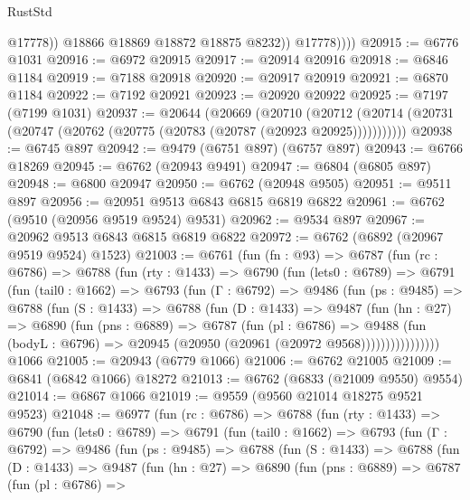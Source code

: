 \begin{lexlean}{RustStd}
\begin{coremodule}
                    @17778))
                @18866
                @18869
                @18872
                @18875
                @8232))
            @17778))))
@20915 := @6776 @1031
@20916 := @6972 @20915
@20917 := @20914 @20916
@20918 := @6846 @1184
@20919 := @7188 @20918
@20920 := @20917 @20919
@20921 := @6870 @1184
@20922 := @7192 @20921
@20923 := @20920 @20922
@20925 := @7197 (@7199 @1031)
@20937 := @20644
    (@20669
      (@20710
        (@20712 (@20714 (@20731 (@20747 (@20762 (@20775 (@20783 (@20787 (@20923 @20925)))))))))))
@20938 := @6745 @897
@20942 := @9479 (@6751 @897) (@6757 @897)
@20943 := @6766 @18269
@20945 := @6762 (@20943 @9491)
@20947 := @6804 (@6805 @897)
@20948 := @6800 @20947
@20950 := @6762 (@20948 @9505)
@20951 := @9511 @897
@20956 := @20951 @9513 @6843 @6815 @6819 @6822
@20961 := @6762 (@9510 (@20956 @9519 @9524) @9531)
@20962 := @9534 @897
@20967 := @20962 @9513 @6843 @6815 @6819 @6822
@20972 := @6762 (@6892 (@20967 @9519 @9524) @1523)
@21003 := @6761
    (fun (fn : @93) =>
    @6787
      (fun (rc : @6786) =>
      @6788
        (fun (rty : @1433) =>
        @6790
          (fun (lets0 : @6789) =>
          @6791
            (fun (tail0 : @1662) =>
            @6793
              (fun (Γ : @6792) =>
              @9486
                (fun (ps : @9485) =>
                @6788
                  (fun (S : @1433) =>
                  @6788
                    (fun (D : @1433) =>
                    @9487
                      (fun (hn : @27) =>
                      @6890
                        (fun (pns : @6889) =>
                        @6787
                          (fun (pl : @6786) =>
                          @9488
                            (fun (bodyL : @6796) =>
                            @20945 (@20950 (@20961 (@20972 @9568))))))))))))))))
    @1066
@21005 := @20943 (@6779 @1066)
@21006 := @6762 @21005
@21009 := @6841 (@6842 @1066) @18272
@21013 := @6762 (@6833 (@21009 @9550) @9554)
@21014 := @6867 @1066
@21019 := @9559 (@9560 @21014 @18275 @9521 @9523)
@21048 := @6977
    (fun (rc : @6786) =>
    @6788
      (fun (rty : @1433) =>
      @6790
        (fun (lets0 : @6789) =>
        @6791
          (fun (tail0 : @1662) =>
          @6793
            (fun (Γ : @6792) =>
            @9486
              (fun (ps : @9485) =>
              @6788
                (fun (S : @1433) =>
                @6788
                  (fun (D : @1433) =>
                  @9487
                    (fun (hn : @27) =>
                    @6890
                      (fun (pns : @6889) =>
                      @6787
                        (fun (pl : @6786) =>

\end{coremodule}
\end{lexlean}
